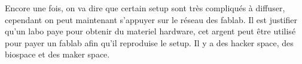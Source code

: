 Encore une fois, on va dire que certain setup sont très compliqués à diffuser, cependant on peut maintenant s'appuyer sur le réseau des fablab. Il est justifier qu'un labo paye pour obtenir du materiel hardware, cet argent peut être utilisé pour payer un fablab afin qu'il reproduise le setup. Il y a des hacker space, des biospace et des maker space.





